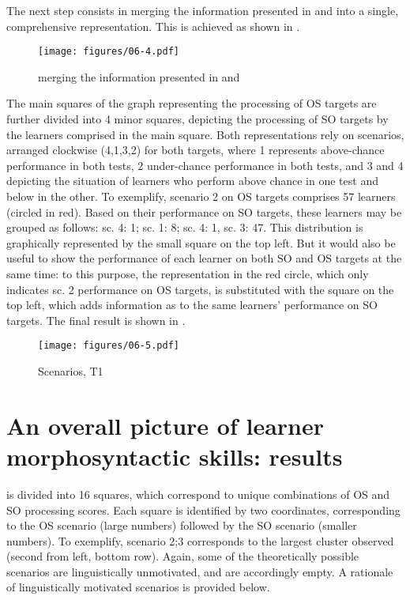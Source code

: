The next step consists in merging the information presented in  and  into a single, comprehensive representation. This is achieved as shown in . 

\begin{figure}
    \texttt{[image: figures/06-4.pdf]}
    \caption{merging the information presented in  and }
    \label{fig:06:4}
\end{figure}

The main squares of the graph representing the processing of OS targets are further divided into 4 minor squares, depicting the processing of SO targets by the learners comprised in the main square. Both representations rely on scenarios, arranged clockwise (4,1,3,2) for both targets, where 1 represents above-chance performance in both tests, 2 under-chance performance in both tests, and 3 and 4 depicting the situation of learners who perform above chance in one test and below in the other. To exemplify, scenario 2 on OS targets comprises 57 learners (circled in red). Based on their performance on SO targets, these learners may be grouped as follows: sc. 4: 1; sc. 1: 8; sc. 4: 1, sc. 3: 47. This distribution is graphically represented by the small square on the top left. But it would also be useful to show the performance of each learner on both SO and OS targets at the same time: to this purpose, the representation in the red circle, which only indicates sc. 2 performance on OS targets, is substituted with the square on the top left, which adds information as to the same learners’ performance on SO targets. The final result is shown in . 

\begin{figure}
    \texttt{[image: figures/06-5.pdf]}
    \caption{Scenarios, T1}
    \label{fig:06:5}
\end{figure}

\section{An overall picture of learner morphosyntactic skills: results}\label{sec:06:3}

 is divided into 16 squares, which correspond to unique combinations of OS and SO processing scores. Each square is identified by two coordinates, corresponding to the OS scenario (large numbers) followed by the SO scenario (smaller numbers). To exemplify, scenario 2;3 corresponds to the largest cluster observed (second from left, bottom row). Again, some of the theoretically possible scenarios are linguistically unmotivated, and are accordingly empty. A rationale of linguistically motivated scenarios is provided below.

